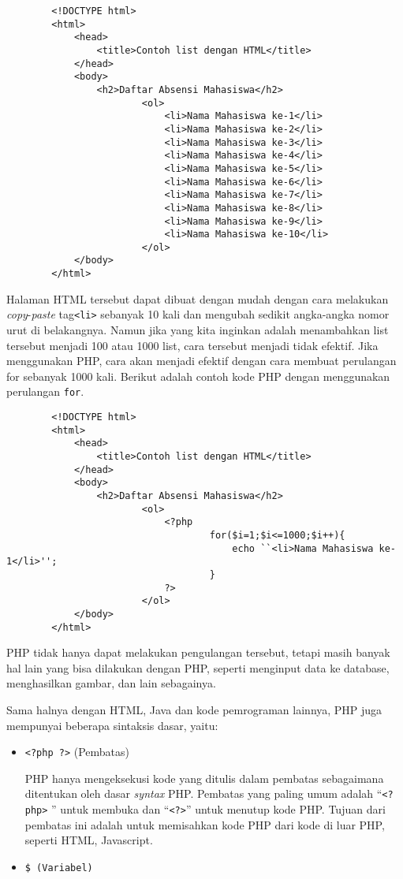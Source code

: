\documentclass[a4paper,twoside]{article}
\begin{document}
\begin{enumerate}
	\begin{lstlisting}
		<!DOCTYPE html>
		<html>
			<head>
				<title>Contoh list dengan HTML</title>
			</head>
			<body>
				<h2>Daftar Absensi Mahasiswa</h2>
						<ol>
							<li>Nama Mahasiswa ke-1</li>
							<li>Nama Mahasiswa ke-2</li>
							<li>Nama Mahasiswa ke-3</li>
							<li>Nama Mahasiswa ke-4</li>
							<li>Nama Mahasiswa ke-5</li>
							<li>Nama Mahasiswa ke-6</li>
							<li>Nama Mahasiswa ke-7</li>
							<li>Nama Mahasiswa ke-8</li>
							<li>Nama Mahasiswa ke-9</li>
							<li>Nama Mahasiswa ke-10</li>							
						</ol>
			</body>
		</html>
	\end{lstlisting}	
	
	Halaman HTML tersebut dapat dibuat dengan mudah dengan cara melakukan \textit{copy}-\textit{paste} tag\texttt{<li>} sebanyak 10 kali dan mengubah sedikit angka-angka nomor urut di belakangnya. Namun jika yang kita inginkan adalah menambahkan list tersebut menjadi 100 atau 1000 list, cara tersebut menjadi tidak efektif. Jika menggunakan PHP, cara akan menjadi efektif dengan cara membuat perulangan for sebanyak 1000 kali. Berikut adalah contoh kode PHP dengan menggunakan perulangan \texttt{for}.

	\begin{lstlisting}
		<!DOCTYPE html>
		<html>
			<head>
				<title>Contoh list dengan HTML</title>
			</head>
			<body>
				<h2>Daftar Absensi Mahasiswa</h2>
						<ol>
							<?php
									for($i=1;$i<=1000;$i++){
										echo ``<li>Nama Mahasiswa ke-1</li>'';
									}
							?>													
						</ol>
			</body>
		</html>
	\end{lstlisting}	

PHP tidak hanya dapat melakukan pengulangan tersebut, tetapi masih banyak hal 
lain yang bisa dilakukan dengan PHP, seperti menginput data ke database, 
menghasilkan gambar, dan lain sebagainya.

Sama halnya dengan HTML, Java dan kode pemrograman lainnya, PHP juga mempunyai beberapa sintaksis dasar, yaitu:
\begin{itemize}
	\item \texttt{<?php ?>} (Pembatas)
	
	PHP hanya mengeksekusi kode yang ditulis dalam pembatas sebagaimana ditentukan oleh dasar \textit{syntax} PHP. Pembatas yang paling umum adalah ``\texttt{<?php>} '' untuk membuka dan ``\texttt{<?>}'' untuk menutup kode PHP. Tujuan dari pembatas ini adalah untuk memisahkan kode PHP dari kode di luar PHP, seperti HTML, Javascript.	
	\item \texttt{\$ (Variabel)}
	

\end{itemize}
\end{enumerate}
\end{document}
